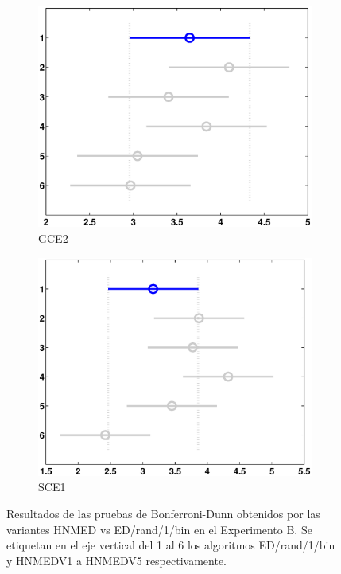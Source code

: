 \begin{figure}
\begin{subfigure}[b]{0.49\linewidth}
		\includegraphics[width=\linewidth]{Figures/B-Bonferroni_HNMED_VS_ED5}
		\caption{GCE2} \label{fig:Bon_G2} 
	\end{subfigure}
	\begin{subfigure}[b]{0.49\linewidth}
		\includegraphics[width=\linewidth]{Figures/B-Bonferroni_HNMED_VS_ED6}
		\caption{SCE1} \label{fig:Bon_S1} 
	\end{subfigure}
	\caption[Resultados de las pruebas de Bonferroni-Dunn  obtenidos por las variantes HNMED vs ED/rand/1/bin en el Experimento B.]{Resultados de las pruebas de Bonferroni-Dunn  obtenidos por las variantes HNMED vs ED/rand/1/bin en el Experimento B. Se etiquetan en el eje vertical del 1 al 6 los algoritmos  ED/rand/1/bin y HNMEDV1 a HNMEDV5   respectivamente.} \label{fig: Resultados de las pruebas de Bonferroni-Dunn para las variantes HNMED vs ED/rand/1/bin en el Experitmento B} 
	
\end{figure}
%


